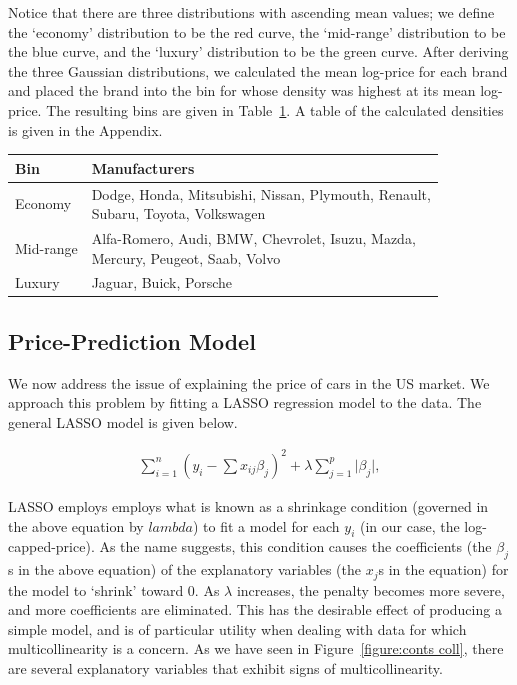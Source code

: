 \documentclass[a4paper, 10pt, titlepage]{article}
\newcommand\Bstrut{\rule[-1.2ex]{0pt}{0pt}}   %
\begin{document}
    Notice that there are three distributions with ascending mean values; we define the `economy' distribution to be the red curve, the `mid-range' distribution to be the blue curve, and the `luxury' distribution to be the green curve. After deriving the three Gaussian distributions, we calculated the mean log-price for each brand and placed the brand into the bin for whose density was highest at its mean log-price. The resulting bins are given in Table~\ref{table:bins}. A table of the calculated densities is given in the Appendix.
    
    \begin{table}[!ht]
	\centering
	\begin{tabular}{|l|l|}
		\hline
		\textbf{Bin} & \textbf{Manufacturers}\\
		\hline
		Economy & \makecell[tl]{Dodge, Honda, Mitsubishi, Nissan, Plymouth, Renault,\\ Subaru, Toyota, Volkswagen\Bstrut}\\
		Mid-range & \makecell[tl]{Alfa-Romero, Audi, BMW, Chevrolet, Isuzu, Mazda,\\ Mercury, Peugeot, Saab, Volvo\Bstrut}\\
		Luxury & Jaguar, Buick, Porsche\\
        \hline
	\end{tabular}
	\label{table:bins}
    \end{table}

\subsection{Price-Prediction Model}
We now address the issue of explaining the price of cars in the US market. We approach this problem by fitting a LASSO regression model to the data. The general LASSO model is given below.

\begin{align}
	\sum_{i=1}^{n} (y_i - \sum x_{ij}\beta_j)^2 + \lambda \sum_{j=1}^{p}\lvert \beta_j \rvert,
\end{align}

LASSO employs employs what is known as a shrinkage condition (governed in the above equation by $
lambda$) to fit a model for each $y_i$ (in our case, the log-capped-price). As the name suggests, this condition causes the coefficients (the $\beta_j$s in the above equation) of the explanatory variables (the $x_j$s in the equation) for the model to `shrink' toward 0. As $\lambda$ increases, the penalty becomes more severe, and more coefficients are eliminated. This has the desirable effect of producing a simple model, and is of particular utility when dealing with data for which multicollinearity is a concern. As we have seen in Figure~\ref{figure:conts coll}, there are several explanatory variables that exhibit signs of multicollinearity. 
\end{document}
